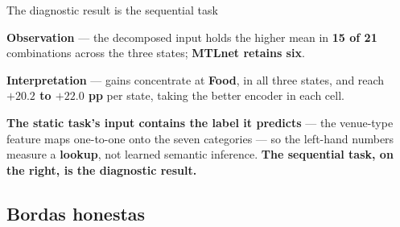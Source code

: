 \documentclass{beamer}
\begin{document}
\begin{frame}{The diagnostic result is the sequential task}
    \vspace{1mm}
    {\scriptsize
    \textbf{Observation} --- the decomposed input holds the higher mean in \textbf{15 of 21}
    combinations across the three states; \textbf{MTLnet retains six}.\par
    \textbf{Interpretation} --- gains concentrate at \textbf{Food}, in all three states, and reach
    \textbf{$+20.2$ to $+22.0$ pp} per state, taking the better encoder in each cell.\par}

    \vspace{0.8mm}
    {\scriptsize\color{alertshade}
    \textbf{The static task's input contains the label it predicts} --- the venue-type feature maps
    one-to-one onto the seven categories --- so the left-hand numbers measure a \textbf{lookup},
    not learned semantic inference. \textbf{The sequential task, on the right, is the diagnostic
    result.}\par}
\end{frame}

\subsection{Bordas honestas}
\end{document}
